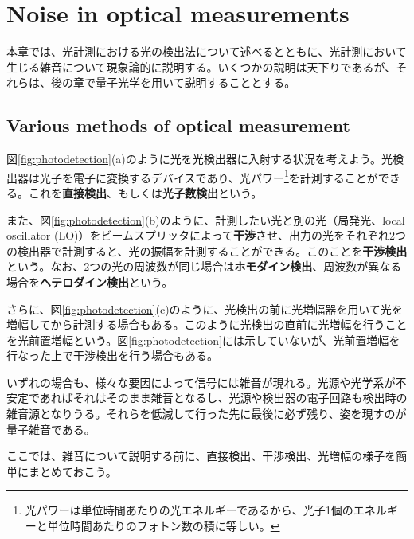 \chapter{Noise in optical measurements}

本章では、光計測における光の検出法について述べるとともに、光計測において生じる雑音について現象論的に説明する。いくつかの説明は天下りであるが、それらは、後の章で量子光学を用いて説明することとする。

\section{Various methods of optical measurement}
\label{section:noise_in_optical_measurement}


図\ref{fig:photodetection}(a)のように光を光検出器に入射する状況を考えよう。光検出器は光子を電子に変換するデバイスであり、光パワー\footnote{光パワーは単位時間あたりの光エネルギーであるから、光子1個のエネルギーと単位時間あたりのフォトン数の積に等しい。}を計測することができる。これを\textbf{直接検出}、もしくは\textbf{光子数検出}という。

また、図\ref{fig:photodetection}(b)のように、計測したい光と別の光（局発光、local oscillator (LO)）をビームスプリッタによって\textbf{干渉}させ、出力の光をそれぞれ2つの検出器で計測すると、光の振幅を計測することができる。このことを\textbf{干渉検出}という。なお、2つの光の周波数が同じ場合は\textbf{ホモダイン検出}、周波数が異なる場合を\textbf{ヘテロダイン検出}という。

さらに、図\ref{fig:photodetection}(c)のように、光検出の前に光増幅器を用いて光を増幅してから計測する場合もある。このように光検出の直前に光増幅を行うことを光前置増幅という。図\ref{fig:photodetection}には示していないが、光前置増幅を行なった上で干渉検出を行う場合もある。

いずれの場合も、様々な要因によって信号には雑音が現れる。光源や光学系が不安定であればそれはそのまま雑音となるし、光源や検出器の電子回路も検出時の雑音源となりうる。それらを低減して行った先に最後に必ず残り、姿を現すのが量子雑音である。

ここでは、雑音について説明する前に、直接検出、干渉検出、光増幅の様子を簡単にまとめておこう。

